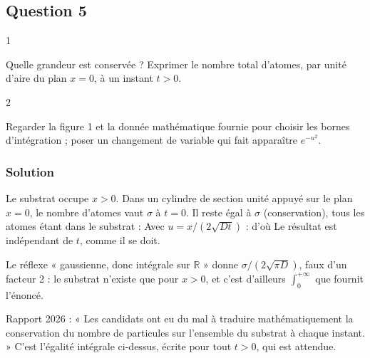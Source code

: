\documentclass[11pt,a4paper]{article}
\newcommand{\equationajustee}[1]{%
  \sbox{\boiteequation}{$\displaystyle #1$}%
  \ifdim\wd\boiteequation>\linewidth
    \[\resizebox{\linewidth}{!}{\usebox{\boiteequation}}\]%
  \else
    \[#1\]%
  \fi}
\begin{document}
\hypertarget{question-5}{%
\subsection{Question 5}\label{question-5}}

\begin{indication}{1}

Quelle grandeur est conservée ? Exprimer le nombre total d'atomes, par unité d'aire du plan \(x=0\), à un instant \(t>0\).

\end{indication}

\begin{indication}{2}

Regarder la figure 1 et la donnée mathématique fournie pour choisir les bornes d'intégration ; poser un changement de variable qui fait apparaître \(e^{-u^2}\).

\end{indication}

\hypertarget{solution-4}{%
\subsubsection{Solution}\label{solution-4}}

Le substrat occupe \(x>0\). Dans un cylindre de section unité appuyé sur le plan \(x=0\), le nombre d'atomes vaut \(\sigma\) à \(t=0\). Il reste égal à \(\sigma\) (conservation), tous les atomes étant dans le substrat :
\equationajustee{\int_0^{+\infty}C(x,t)\,\mathrm dx=\sigma .}
Avec \(u=x/(2\sqrt{Dt})\) :
\equationajustee{\begin{aligned}
\int_0^{+\infty}\frac{\alpha}{\sqrt t}e^{-x^2/(4Dt)}\mathrm dx&=\frac{\alpha}{\sqrt t}\,2\sqrt{Dt}\,\frac{\sqrt\pi}2\\
&=\alpha\sqrt{\pi D}
\end{aligned}}
d'où
\equationajustee{\boxed{\alpha=\frac{\sigma}{\sqrt{\pi D}}}}
Le résultat est indépendant de \(t\), comme il se doit.

\begin{piege}

Le réflexe « gaussienne, donc intégrale sur \(\mathbb R\) » donne \(\sigma/(2\sqrt{\pi D})\), faux d'un facteur 2 : le substrat n'existe que pour \(x>0\), et c'est d'ailleurs \(\int_0^{+\infty}\) que fournit l'énoncé.

\end{piege}

\begin{jury}

Rapport 2026 : « Les candidats ont eu du mal à traduire mathématiquement la conservation du nombre de particules sur l'ensemble du substrat à chaque instant. » C'est l'égalité intégrale ci-dessus, écrite pour tout \(t>0\), qui est attendue.

\end{jury}
\end{document}
